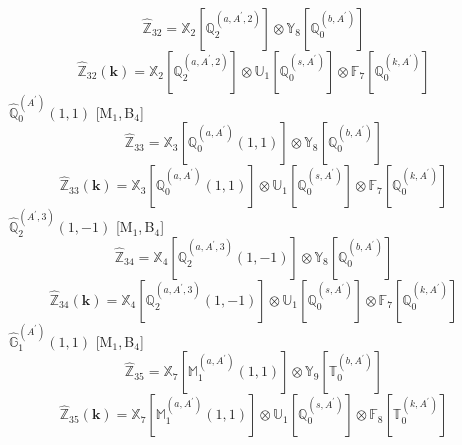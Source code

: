 \documentclass[fleqn,10pt,landscape]{article}
\begin{document}
\begin{itemize}
\begin{dmath*}
\hat{\mathbb{Z}}_{32}=\mathbb{X}_{2}[\mathbb{Q}_{2}^{(a,A^{\prime},2)}] \otimes\mathbb{Y}_{8}[\mathbb{Q}_{0}^{(b,A^{\prime})}]
\end{dmath*}
\begin{dmath*}
\hat{\mathbb{Z}}_{32}(\bm{k})=\mathbb{X}_{2}[\mathbb{Q}_{2}^{(a,A^{\prime},2)}] \otimes\mathbb{U}_{1}[\mathbb{Q}_{0}^{(s,A^{\prime})}] \otimes\mathbb{F}_{7}[\mathbb{Q}_{0}^{(k,A^{\prime})}]
\end{dmath*}
\vspace{4mm}
\noindent {} $\,\,\,\hat{\mathbb{Q}}_{0}^{(A^{\prime})}(1,1)$ [M$_{1}$,\,B$_{4}$]
\begin{dmath*}
\hat{\mathbb{Z}}_{33}=\mathbb{X}_{3}[\mathbb{Q}_{0}^{(a,A^{\prime})}(1,1)] \otimes\mathbb{Y}_{8}[\mathbb{Q}_{0}^{(b,A^{\prime})}]
\end{dmath*}
\begin{dmath*}
\hat{\mathbb{Z}}_{33}(\bm{k})=\mathbb{X}_{3}[\mathbb{Q}_{0}^{(a,A^{\prime})}(1,1)] \otimes\mathbb{U}_{1}[\mathbb{Q}_{0}^{(s,A^{\prime})}] \otimes\mathbb{F}_{7}[\mathbb{Q}_{0}^{(k,A^{\prime})}]
\end{dmath*}
\vspace{4mm}
\noindent {} $\,\,\,\hat{\mathbb{Q}}_{2}^{(A^{\prime},3)}(1,-1)$ [M$_{1}$,\,B$_{4}$]
\begin{dmath*}
\hat{\mathbb{Z}}_{34}=\mathbb{X}_{4}[\mathbb{Q}_{2}^{(a,A^{\prime},3)}(1,-1)] \otimes\mathbb{Y}_{8}[\mathbb{Q}_{0}^{(b,A^{\prime})}]
\end{dmath*}
\begin{dmath*}
\hat{\mathbb{Z}}_{34}(\bm{k})=\mathbb{X}_{4}[\mathbb{Q}_{2}^{(a,A^{\prime},3)}(1,-1)] \otimes\mathbb{U}_{1}[\mathbb{Q}_{0}^{(s,A^{\prime})}] \otimes\mathbb{F}_{7}[\mathbb{Q}_{0}^{(k,A^{\prime})}]
\end{dmath*}
\vspace{4mm}
\noindent {} $\,\,\,\hat{\mathbb{G}}_{1}^{(A^{\prime})}(1,1)$ [M$_{1}$,\,B$_{4}$]
\begin{dmath*}
\hat{\mathbb{Z}}_{35}=\mathbb{X}_{7}[\mathbb{M}_{1}^{(a,A^{\prime})}(1,1)] \otimes\mathbb{Y}_{9}[\mathbb{T}_{0}^{(b,A^{\prime})}]
\end{dmath*}
\begin{dmath*}
\hat{\mathbb{Z}}_{35}(\bm{k})=\mathbb{X}_{7}[\mathbb{M}_{1}^{(a,A^{\prime})}(1,1)] \otimes\mathbb{U}_{1}[\mathbb{Q}_{0}^{(s,A^{\prime})}] \otimes\mathbb{F}_{8}[\mathbb{T}_{0}^{(k,A^{\prime})}]
\end{dmath*}
\vspace{4mm}

\end{itemize}
\end{document}
